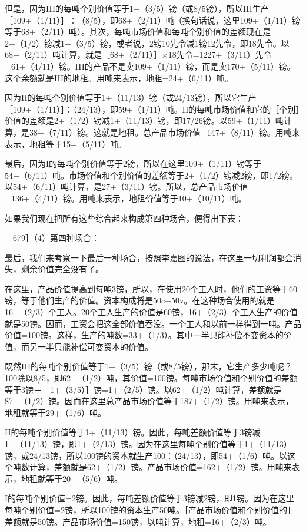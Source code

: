 但是，因为III的每吨个别价值等于1+（3/5）镑（或8/5镑），所以III生产［109+（1/11）］∶（8/5），即68+（2/11）吨（换句话说，这里109+（1/11）镑等于68+（2/11）吨）。其次，每吨市场价值和每吨个别价值的差额现在是2+（1/2）镑减1+（3/5）镑，或者说，2镑10先令减1镑12先令，即18先令。以68+（2/11）吨计算，就是［68+（2/11）］×18先令=1227+（3/11）先令=61+（4/11）镑。III的产品不是卖109+（1/11）镑，而是卖170+（5/11）镑。这个余额就是III的地租。用吨来表示，地租=24+（6/11）吨。

因为II的每吨个别价值等于1+（11/13）镑（或24/13镑），所以它生产［109+（1/11）］：（24/13），即59+（1/11）吨。II的每吨市场价值和它的［个别］价值的差额是2+（1/2）镑减1+（11/13）镑，即17/26镑。以59+（1/11）吨计算，是38+（7/11）镑。这就是地租。总产品市场价值=147+（8/11）镑。用吨来表示，地租等于15+（5/11）吨。

最后，因为I的每吨个别价值等于2镑，所以在这里109+（1/11）镑等于54+（6/11）吨。市场价值和个别价值的差额等于2+（1/2）镑减2镑，即1/2镑。以54+（6/11）吨计算，是27+（3/11）镑。所以，总产品市场价值=136+（4/11）镑。用吨来表示，地租价值等于10+（10/11）吨。

如果我们现在把所有这些综合起来构成第四种场合，便得出下表：

［679］（4）第四种场合：

\todo{}

最后，我们来考察一下最后一种场合，按照李嘉图的说法，在这里一切利润都会消失，剩余价值完全没有了。

在这里，产品价值提高到每吨3镑，所以，在使用20个工人时，他们的工资等于60镑，等于他们生产的价值。资本构成将是50c+50v。在这种场合使用的就是16+（2/3）个工人。20个工人生产的价值是60镑，16+（2/3）个工人生产的价值就是50镑。因而，工资会把这全部价值吞没。一个工人和以前一样得到一吨。产品价值=100镑。这样，生产的吨数=33+（1/3）。其中一半只能补偿不变资本的价值，而另一半只能补偿可变资本的价值。

既然III的每吨个别价值等于1+（3/5）镑（或8/5镑），那末，它生产多少吨呢？100除以8/5，即62+（1/2）吨，其价值=100镑。每吨市场价值和个别价值的差额等于3镑－［1+（3/5）］镑=1+（2/5）镑。以62+（1/2）吨计算，差额就是87+（1/2）镑。因而在这里总产品市场价值等于187+（1/2）镑。用吨来表示，地租就等于29+（1/6）吨。

II的每吨个别价值等于1+（11/13）镑。因此，每吨差额价值等于3镑减1+（11/13）镑，即1+（2/13）镑。因为在这里每吨个别价值等于1+（11/13）镑，或24/13镑，所以100镑的资本就生产100：（24/13），即54+（1/6）吨。以这个吨数计算，差额就是62+（1/2）镑。产品市场价值=162+（1/2）镑。用吨来表示，地租就等于20+（5/6）吨。

I的每吨个别价值=2镑。因此，每吨差额价值等于3镑减2镑，即1镑。因为在这里每吨个别价值=2镑，所以100镑的资本生产50吨。［产品市场价值和个别价值的］差额就是50镑。产品市场价值=150镑，以吨计算，地租=16+（2/3）吨。

